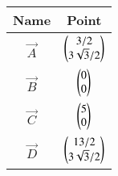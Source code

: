 \begin{tabular}[12pt]{ |c| c|}
    \hline
    \textbf{Name} & \textbf{Point}\\ 
    \hline
	$\vec{A}$ & $\begin{pmatrix}3/2 \\ 3\sqrt{3}/2\end{pmatrix}$\\
    \hline
    $\vec{B}$ & $\begin{pmatrix}0\\0\end{pmatrix}$\\
    \hline
    $\vec{C}$ & $\begin{pmatrix}5 \\ 0\end{pmatrix}$\\
    \hline
    $\vec{D}$ & $\begin{pmatrix}13/2 \\ 3\sqrt{3}/2\end{pmatrix}$ \\
    \hline
\end{tabular}